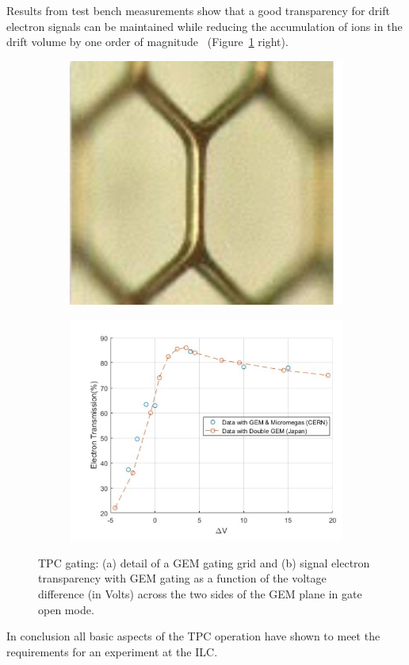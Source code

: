 Results from test bench measurements show that a good transparency for drift electron signals can be maintained while reducing the accumulation of ions in the drift volume by one order of magnitude~\cite{ild:bib:TPC_gatingpaper} (Figure~\ref{fig:det:TPC_gating} right).

\begin{figure}[t!]
\centering
\begin{subfigure}{0.40\textwidth}
\includegraphics[width=1.0\hsize]{Detector/fig/TPC_gating_gem.jpg}
\caption{}
\end{subfigure}
\begin{subfigure}{0.48\textwidth}
\includegraphics[width=1.0\hsize]{Detector/fig/TPC_gating_transparency.jpg}
\caption{}
\end{subfigure}
\caption{TPC gating: (a) detail of a GEM gating grid and (b) signal electron transparency with GEM gating as a function of the voltage difference (in Volts) across the two sides of the GEM plane in gate open mode.} 
\label{fig:det:TPC_gating}
\end{figure}

In conclusion all basic aspects of the TPC operation have shown to meet the requirements for an experiment at the ILC. 